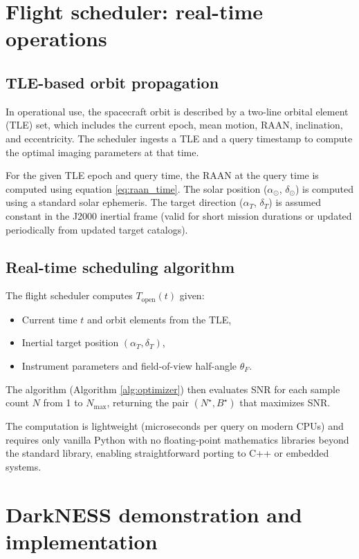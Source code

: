 \documentclass[preprint,12pt]{elsarticle}
\theoremstyle{definition}
\theoremstyle{remark}
\begin{document}
\section{Flight scheduler: real-time operations}

\subsection{TLE-based orbit propagation}

In operational use, the spacecraft orbit is described by a two-line orbital element (TLE) set, which includes the current epoch, mean motion, RAAN, inclination, and eccentricity.
The scheduler ingests a TLE and a query timestamp to compute the optimal imaging parameters at that time.

For the given TLE epoch and query time, the RAAN at the query time is computed using equation \eqref{eq:raan_time}.
The solar position ($\alpha_\odot$, $\delta_\odot$) is computed using a standard solar ephemeris.
The target direction ($\alpha_T$, $\delta_T$) is assumed constant in the J2000 inertial frame (valid for short mission durations or updated periodically from updated target catalogs).

\subsection{Real-time scheduling algorithm}

The flight scheduler computes $T_{\mathrm{open}}(t)$ given:
\begin{itemize}
\item Current time $t$ and orbit elements from the TLE,
\item Inertial target position $(\alpha_T,\delta_T)$,
\item Instrument parameters and field-of-view half-angle $\theta_F$.
\end{itemize}

The algorithm (Algorithm \ref{alg:optimizer}) then evaluates SNR for each sample count $N$ from 1 to $N_{\max}$, returning the pair $(N^\star,B^\star)$ that maximizes SNR.

The computation is lightweight (microseconds per query on modern CPUs) and requires only vanilla Python with no floating-point mathematics libraries beyond the standard library, enabling straightforward porting to C++ or embedded systems.

\section{DarkNESS demonstration and implementation}
\end{document}
